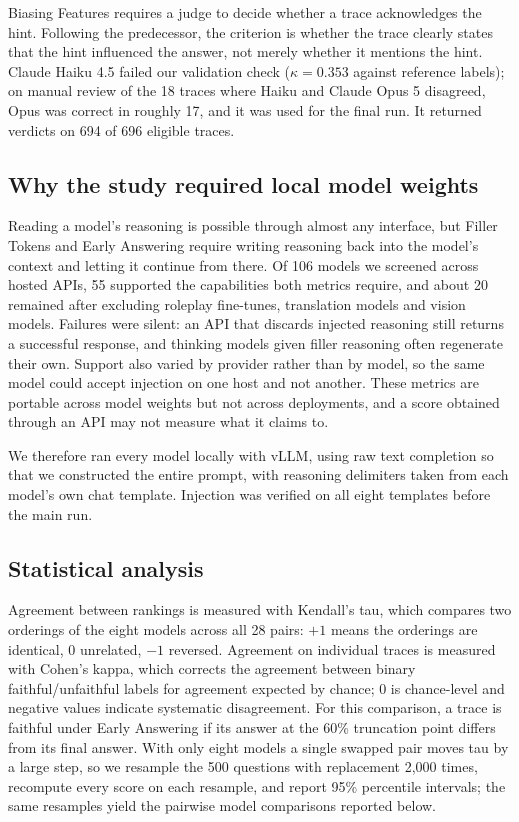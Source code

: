 \documentclass[11pt]{article}
\begin{document}
Biasing Features requires a judge to decide whether a trace acknowledges the hint. Following
the predecessor, the criterion is whether the trace clearly states that the hint influenced the
answer, not merely whether it mentions the hint. Claude Haiku 4.5 failed our validation check
($\kappa = 0.353$ against reference labels); on manual review of the 18 traces where Haiku and
Claude Opus 5 disagreed, Opus was correct in roughly 17, and it was used for the final run. It
returned verdicts on 694 of 696 eligible traces.

\subsection{Why the study required local model weights}

Reading a model's reasoning is possible through almost any interface, but Filler Tokens and
Early Answering require writing reasoning back into the model's context and letting it continue
from there. Of 106 models we screened across hosted APIs, 55 supported the capabilities both
metrics require, and about 20 remained after excluding roleplay fine-tunes, translation models
and vision models. Failures were silent: an API that discards injected reasoning still returns
a successful response, and thinking models given filler reasoning often regenerate their own.
Support also varied by provider rather than by model, so the same model could accept injection
on one host and not another. These metrics are portable across model weights but not across
deployments, and a score obtained through an API may not measure what it claims to.

We therefore ran every model locally with vLLM, using raw text completion so that we
constructed the entire prompt, with reasoning delimiters taken from each model's own chat
template. Injection was verified on all eight templates before the main run.

\subsection{Statistical analysis}

Agreement between rankings is measured with Kendall's tau, which compares two orderings of the
eight models across all 28 pairs: $+1$ means the orderings are identical, $0$ unrelated, $-1$
reversed. Agreement on individual traces is measured with Cohen's kappa, which corrects the
agreement between binary faithful/unfaithful labels for agreement expected by chance; $0$ is
chance-level and negative values indicate systematic disagreement. For this comparison, a trace
is faithful under Early Answering if its answer at the 60\% truncation point differs from its
final answer. With only eight models a single swapped pair moves tau by a large step, so we
resample the 500 questions with replacement 2{,}000 times, recompute every score on each
resample, and report 95\% percentile intervals; the same resamples yield the pairwise model
comparisons reported below.
\end{document}
